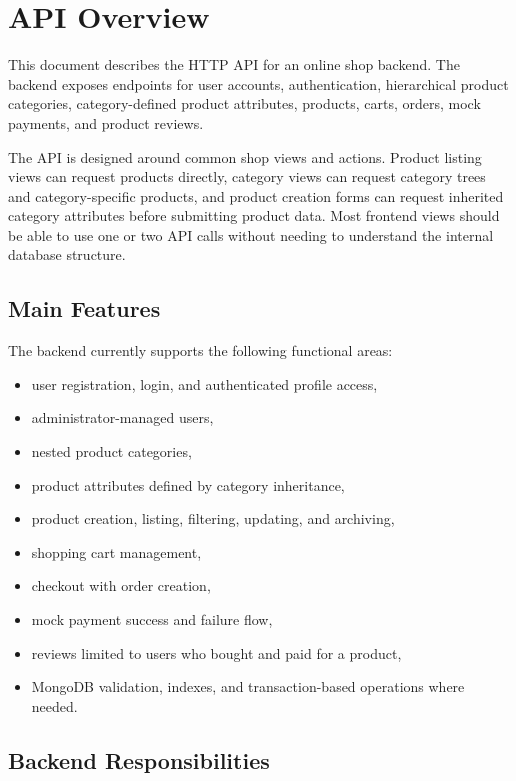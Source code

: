 \section{API Overview}

This document describes the HTTP API for an online shop backend. The backend exposes endpoints for user accounts, authentication, hierarchical product categories, category-defined product attributes, products, carts, orders, mock payments, and product reviews.

The API is designed around common shop views and actions. Product listing views can request products directly, category views can request category trees and category-specific products, and product creation forms can request inherited category attributes before submitting product data. Most frontend views should be able to use one or two API calls without needing to understand the internal database structure.

\subsection{Main Features}

The backend currently supports the following functional areas:

\begin{itemize}
    \item user registration, login, and authenticated profile access,
    \item administrator-managed users,
    \item nested product categories,
    \item product attributes defined by category inheritance,
    \item product creation, listing, filtering, updating, and archiving,
    \item shopping cart management,
    \item checkout with order creation,
    \item mock payment success and failure flow,
    \item reviews limited to users who bought and paid for a product,
    \item MongoDB validation, indexes, and transaction-based operations where needed.
\end{itemize}

\subsection{Backend Responsibilities}

